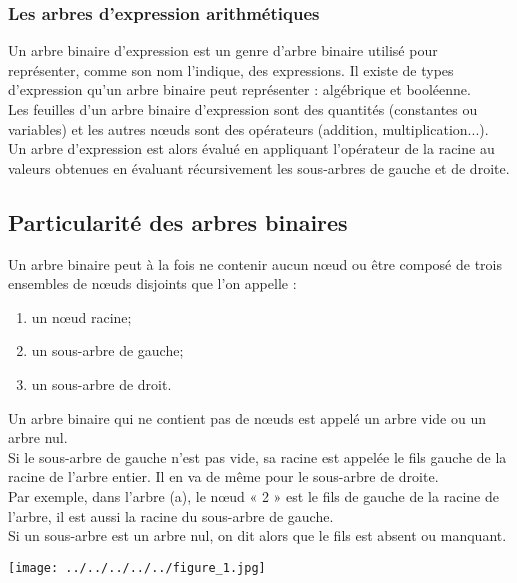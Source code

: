 \documentclass{report}
\begin{document}
\subsubsection{Les arbres d'expression arithmétiques}

Un arbre binaire d'expression est un genre d'arbre binaire utilisé pour représenter, comme son nom l'indique, des expressions. Il existe de types d'expression qu'un arbre binaire peut représenter : algébrique et booléenne.  \\ 
Les feuilles d'un arbre binaire d'expression sont des quantités (constantes ou variables) et les autres nœuds sont des opérateurs (addition, multiplication...).\\
Un arbre d'expression est alors évalué en appliquant l'opérateur de la racine au valeurs obtenues en évaluant récursivement les sous-arbres de gauche et de droite.


  
\subsection{Particularité des arbres binaires}

Un arbre binaire peut à la fois ne contenir aucun nœud ou être composé de trois ensembles de nœuds disjoints que l'on appelle :
\begin{enumerate}
\item un nœud racine;
\item un sous-arbre de gauche;
\item un sous-arbre de droit.
\end{enumerate}

Un arbre binaire qui ne contient pas de nœuds est appelé un arbre vide ou un arbre nul.\\
Si le sous-arbre de gauche n'est pas vide, sa racine est appelée le fils gauche de la racine de l'arbre entier. Il en va de même pour le sous-arbre de droite.\\
Par exemple, dans l'arbre (a), le nœud « 2 » est le fils de gauche de la racine de l'arbre, il est aussi la racine du sous-arbre de gauche.\\
Si un sous-arbre est un arbre nul, on dit alors que le fils est absent ou manquant.\\

\begin{center}
\texttt{[image: ../../../../../figure\_1.jpg]} 
\label{fig1}
\end{center} 
\end{document}
